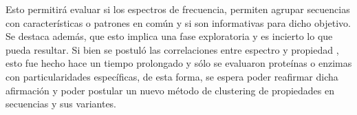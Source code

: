 Esto permitirá evaluar si los espectros de frecuencia, permiten agrupar secuencias con características o patrones en común y si son informativas para dicho objetivo. Se destaca además, que esto implica una fase exploratoria y es incierto lo que pueda resultar. Si bien se postuló las correlaciones entre espectro y propiedad \cite{veljkovic1985possible}, esto fue hecho hace un tiempo prolongado y sólo se evaluaron proteínas o enzimas con particularidades específicas, de esta forma, se espera poder reafirmar dicha afirmación y poder postular un nuevo método de clustering de propiedades en secuencias y sus variantes.

 